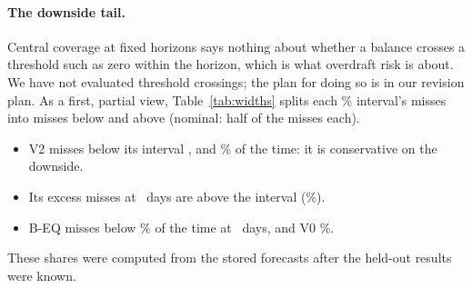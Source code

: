 \begin{table}[t]
\centering\footnotesize
{}
\caption{Claim A2 for V2, cell by cell: pooled coverage (\%) with its
\% account-bootstrap interval, and the verdict. Pass: the
interval lies inside the band around nominal. Fail: wholly outside.
Inconclusive: it straddles an edge. Held-out, 
origins in  accounts per horizon.}
\label{tab:a2}
\end{table}

\paragraph{The downside tail.} Central coverage at fixed horizons says
nothing about whether a balance crosses a threshold such as zero within the
horizon, which is what overdraft risk is about. We have not evaluated
threshold crossings; the plan for doing so is in our revision plan. As a
first, partial view, Table~\ref{tab:widths} splits each \lC\% interval's
misses into misses below and above (nominal: half of the misses each).
\begin{itemize}
\item V2 misses below its interval ,
   and \% of the time:
  it is conservative on the downside.
\item Its excess misses at \hA\ days are above the interval
  (\%).
\item B-EQ misses below \% of the time at
  \hC\ days, and V0 \%.
\end{itemize}
These shares were computed from the stored forecasts after the held-out
results were known.

\begin{table}[t]
\centering\footnotesize
{}
\caption{Held-out \lC\% intervals: width, as the median over accounts of
the account's mean width (CZK, unnormalized), and pooled misses below
and above the interval (\%; nominal is half of the misses each). Same
origins as Table~\ref{tab:heldout}. The misses were computed post hoc from
the stored forecasts.}
\label{tab:widths}
\end{table}

